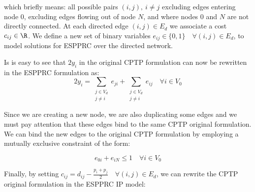 which briefly means: all possible pairs $(i, j),\ i \ne j$ excluding edges entering node $0$, excluding edges flowing out of node $N$, and where nodes $0$ and $N$ are not directly connected.
At each directed edge $(i, j) \in E_d$ we associate a cost $c_{ij} \in \R$.
We define a new set of binary variables $e_{ij} \in \{ 0, 1 \} \quad \forall (i, j) \in E_d$, to model solutions for ESPPRC over the directed network.

Is is easy to see that $2 y_i$ in the original CPTP formulation can now be rewritten in the ESPPRC formulation as:
\begin{equation}
	2 y_i = \sum_{\substack{j \in V_d \\ j \ne i}} e_{ji} + \sum_{\substack{j \in V_d \\ j \ne i}} e_{ij} \quad \forall i \in V_0
\end{equation}

Since we are creating a new node, we are also duplicating some edges and we must pay attention that these edges bind to the same CPTP original formulation.
We can bind the new edges to the original CPTP formulation by employing a mutually exclusive constraint of the form:

\begin{equation}
	e_{0i} + e_{iN} \le 1 \quad \forall i \in V_0
\end{equation}

Finally, by setting $c_{ij} = d_{ij} - \frac{p_i + p_j}{2} \quad \forall (i, j) \in E_d$, we can rewrite the CPTP original formulation in the ESPPRC IP model:

